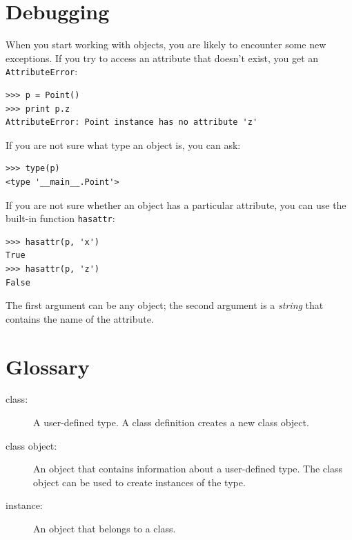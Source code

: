 \documentclass[10pt]{book}
\begin{document}
{\section{Debugging}
\label{hasattr}


When you start working with objects, you are likely to encounter
some new exceptions.  If you try to access an attribute
that doesn't exist, you get an {\tt AttributeError}:


\beforeverb
\begin{verbatim}
>>> p = Point()
>>> print p.z
AttributeError: Point instance has no attribute 'z'
\end{verbatim}
\afterverb
%
If you are not sure what type an object is, you can ask:


\beforeverb
\begin{verbatim}
>>> type(p)
<type '__main__.Point'>
\end{verbatim}
\afterverb
%
If you are not sure whether an object has a particular attribute,
you can use the built-in function {\tt hasattr}:


\beforeverb
\begin{verbatim}
>>> hasattr(p, 'x')
True
>>> hasattr(p, 'z')
False
\end{verbatim}
\afterverb
%
The first argument can be any object; the second argument is a {\em
string} that contains the name of the attribute.


\section{Glossary}

\begin{description}

\item[class:] A user-defined type.  A class definition creates a new
class object.

\item[class object:] An object that contains information about a
user-defined type.  The class object can be used to create instances
of the type.

\item[instance:] An object that belongs to a class.


\end{description}}
\end{document}
